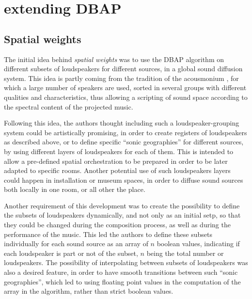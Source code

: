\documentclass[twoside,10pt]{article}
\begin{document}
%
%

\section{extending DBAP}

\subsection{Spatial weights}

The initial idea behind \textit{spatial weights} was to use the DBAP algorithm on different subsets of loudspeakers for different sources, in a global sound diffusion system. This idea is partly coming from the tradition of the acousmonium \cite{Bayle:1993MusiqueAcousmatique}, for which a large number of speakers are used, sorted in several groups with different qualities and characteristics, thus allowing a scripting of sound space according to the spectral content of the projected music\cite{Prager:2002acousmatique}.

Following this idea, the authors thought including such a loudspeaker-grouping system could be artistically promising, in order to create registers of loudspeakers as described above, or to define specific ``sonic geographies'' for different sources, by using different layers of loudspeakers for each of them. This is intended to allow a pre-defined spatial orchestration to be prepared in order to be later adapted to specific rooms\cite{Lyon:2008spatial_orchestration}. Another potential use of such loudspeakers layers could happen in installation or museum spaces, in order to diffuse sound sources both locally in one room, or all other the place.

Another requirement of this development was to create the possibility to define the subsets of loudspeakers dynamically, and not only as an initial setp, so that they could be changed during the composition process, as well as during the performance of the music. This led the authors to define these subsets individually for each sound source as an array of $n$ boolean values, indicating if each loudspeaker is part or not of the subset, $n$ being the total number or loudspeakers.
The possibility of interpolating between subsets of loudspeakers was also a desired feature, in order to have smooth transitions between such ``sonic geographies'', which led to using floating point values in the computation of the array in the algorithm, rather than strict boolean values. 
\end{document}
